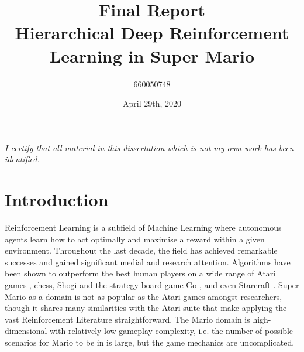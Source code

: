 \documentclass[notitlepage,a4paper,11pt]{article}
\begin{document}
\title{\textbf{Final Report\\
	\large{Hierarchical Deep Reinforcement Learning in Super Mario}}}

\author{660050748}
\date{April 29th, 2020}
\maketitle

\begin{abstract}
 
\end{abstract}


\vspace*{\fill}
\textit{I certify that all material in this dissertation which is not my own work has been identified.}

\fancyhf{}
\fancyhead[LE]{\leftmark}
\fancyhead[RO]{\rightmark}

\fancyfoot[LE,RO]{\thepage}
\pagebreak


\pagebreak
{}
\section{Introduction}
Reinforcement Learning is a subfield of Machine Learning where autonomous agents learn how to act optimally and maximise a reward within a given environment. Throughout the last decade, the field has achieved remarkable successes and gained significant medial and research attention. Algorithms have been shown to outperform the best human players on a wide range of Atari games \cite{DBLP:journals/corr/MnihKSGAWR13}, chess, Shogi and the strategy board game Go \cite{alpha_go}, and even Starcraft \cite{arulkumaran2019alphastar}. Super Mario as a domain is not as popular as the Atari games amongst researchers, though it shares many similarities with the Atari suite that make applying the vast Reinforcement Literature straightforward. The Mario domain is high-dimensional with relatively low gameplay complexity, i.e. the number of possible scenarios for Mario to be in is large, but the game mechanics are uncomplicated.
\end{document}
